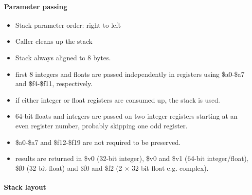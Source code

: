 \paragraph{Parameter passing}

\begin{itemize}
\item Stack parameter order: right-to-left
\item Caller cleans up the stack
\item Stack always aligned to 8 bytes.
\item first 8 integers and floats are passed independently in registers using \$a0-\$a7 and \$f4-\$f11, respectively.
\item if either integer or float registers are consumed up, the stack is used.
\item 64-bit floats and integers are passed on two integer registers starting at an even register number, probably skipping one odd register.
\item \$a0-\$a7 and \$f12-\$f19 are not required to be preserved.
\item results are returned in \$v0 (32-bit integer), \$v0 and \$v1 (64-bit integer/float), \$f0 (32 bit float) and \$f0 and \$f2 (2 $\times$ 32 bit float e.g. complex).
\end{itemize}

\paragraph{Stack layout}

